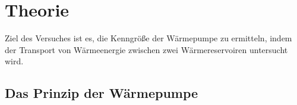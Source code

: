 \section{Theorie}
\label{sec:Theorie}

Ziel des Versuches ist es, die Kenngröße der Wärmepumpe zu 
ermitteln, indem der Transport von Wärmeenergie zwischen
zwei Wärmereservoiren untersucht wird.

\subsection{Das Prinzip der Wärmepumpe}


